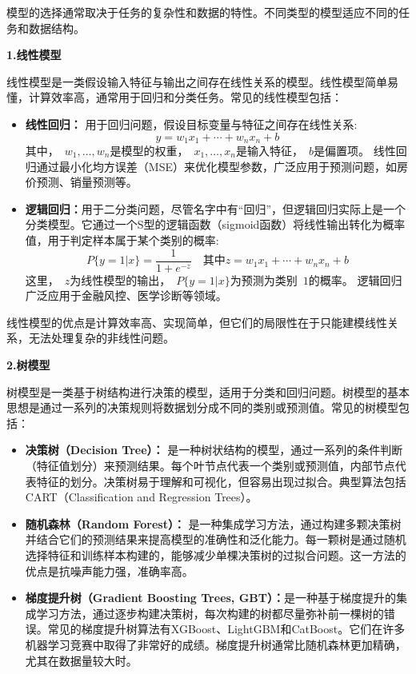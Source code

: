 模型的选择通常取决于任务的复杂性和数据的特性。不同类型的模型适应不同的任务和数据结构。

{\bf 1.线性模型}

线性模型是一类假设输入特征与输出之间存在线性关系的模型。线性模型简单易懂，计算效率高，通常用于回归和分类任务。常见的线性模型包括：
\begin{itemize}
\item {\bf 线性回归：} 用于回归问题，假设目标变量与特征之间存在线性关系:
$$
y =w_1x_1+\cdots+ w_nx_n+b
$$
其中，~$w_1,\dots, w_n$是模型的权重，~$x_1,\dots,x_n$是输入特征，~$b$是偏置项。
线性回归通过最小化均方误差（MSE）来优化模型参数，广泛应用于预测问题，如房价预测、销量预测等。

\item  {\bf 逻辑回归：}用于二分类问题，尽管名字中有“回归”，但逻辑回归实际上是一个分类模型。它通过一个S型的逻辑函数（sigmoid函数）将线性输出转化为概率值，用于判定样本属于某个类别的概率:
$$
P\{ y=1 |x\} = \frac{1}{1+e^{-z}} \quad \mbox{其中} z =w_1x_1+\cdots+ w_nx_n+b
$$
这里，~$z$为线性模型的输出，~$P\{ y=1 |x\} $为预测为类别~$1$的概率。
逻辑回归广泛应用于金融风控、医学诊断等领域。
\end{itemize}
线性模型的优点是计算效率高、实现简单，但它们的局限性在于只能建模线性关系，无法处理复杂的非线性问题。

{\bf 2.树模型}

树模型是一类基于树结构进行决策的模型，适用于分类和回归问题。树模型的基本思想是通过一系列的决策规则将数据划分成不同的类别或预测值。常见的树模型包括：

\begin{itemize}
\item  {\bf 决策树（Decision Tree）：} 是一种树状结构的模型，通过一系列的条件判断（特征值划分）来预测结果。每个叶节点代表一个类别或预测值，内部节点代表特征的划分。决策树易于理解和可视化，但容易出现过拟合。典型算法包括CART（Classification and Regression Trees）。


\item  {\bf  随机森林（Random Forest）： }是一种集成学习方法，通过构建多颗决策树并结合它们的预测结果来提高模型的准确性和泛化能力。每一颗树是通过随机选择特征和训练样本构建的，能够减少单棵决策树的过拟合问题。这一方法的优点是抗噪声能力强，准确率高。

\item  {\bf  梯度提升树（Gradient Boosting Trees, GBT）：}是一种基于梯度提升的集成学习方法，通过逐步构建决策树，每次构建的树都尽量弥补前一棵树的错误。常见的梯度提升树算法有XGBoost、LightGBM和CatBoost。它们在许多机器学习竞赛中取得了非常好的成绩。梯度提升树通常比随机森林更加精确，尤其在数据量较大时。
\end{itemize}

